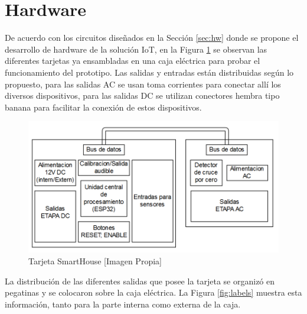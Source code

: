 \section{Hardware}

De acuerdo con los circuitos diseñados en la Sección \ref{sec:hw} donde se propone el desarrollo de hardware de la solución IoT, en la Figura \ref{fig:tarjeta} se observan las diferentes tarjetas ya ensambladas en una caja eléctrica para probar el funcionamiento del prototipo. Las salidas y entradas están distribuidas según lo propuesto, para las salidas AC se usan toma corrientes para conectar allí los diversos dispositivos, para las salidas DC se utilizan conectores hembra tipo banana para facilitar la conexión de estos dispositivos.\\

\begin{figure}[H]
	\centering
	\caption{Tarjeta SmartHouse [Imagen Propia]}
	\label{fig:tarjeta}
	\includegraphics[width=0.6\linewidth]{Imagenes/Tarjeta}
\end{figure}


La distribución de las diferentes salidas que posee la tarjeta se organizó en pegatinas y se colocaron sobre la caja eléctrica. La Figura \ref{fig:labels} muestra esta información, tanto para la parte interna como externa de la caja.\\

